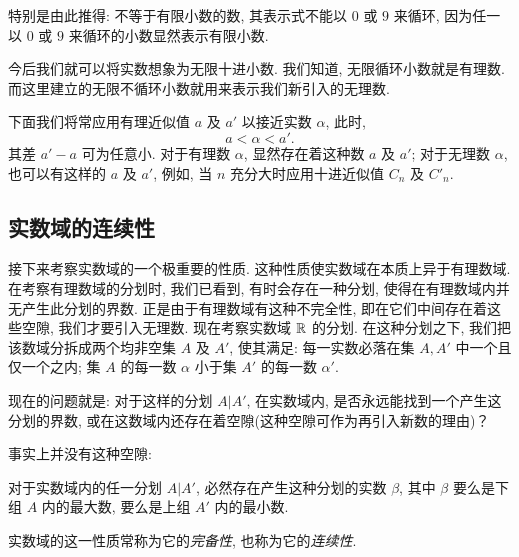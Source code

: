 特别是由此推得:
不等于有限小数的数, 其表示式不能以 $0$ 或 $9$ 来循环,
因为任一以 $0$ 或 $9$ 来循环的小数显然表示有限小数.

今后我们就可以将实数想象为无限十进小数.
我们知道, 无限循环小数就是有理数.
而{\kaishu 这里建立的无限不循环小数就用来表示我们新引入的无理数}.

\begin{remark}\label{rem:rational_approx}
下面我们将常应用有理近似值 $a$ 及 $a'$ 以接近实数 $\alpha$, 此时,
$$ a < \alpha < a'. $$
其差 $a' - a$ 可为任意小.
对于有理数 $\alpha$, 显然存在着这种数 $a$ 及 $a'$;
对于无理数 $\alpha$, 也可以有这样的 $a$ 及 $a'$,
例如, 当 $n$ 充分大时应用十进近似值 $C_n$ 及 $C'_n$.
\end{remark}

\subsection{实数域的连续性}\label{subsec:10}

接下来考察实数域的一个极重要的性质.
这种性质使实数域在本质上异于有理数域.
在考察有理数域的分划时, 我们已看到, 有时会存在一种分划, 使得在有理数域内并无产生此分划的界数.
正是由于有理数域有这种不完全性, 即在它们中间存在着这些空隙, 我们才要引入无理数.
现在考察实数域 $\mathbb{R}$ 的分划.
在这种分划之下, 我们把该数域分拆成两个均非空集 $A$ 及 $A'$, 使其满足:
{\kaishu
    \label{ax:real_cut_1} 每一实数必落在集 $A, A'$ 中一个且仅一个之内;
    \label{ax:real_cut_2} 集 $A$ 的每一数 $\alpha$ 小于集 $A'$ 的每一数 $\alpha'$.
}

现在的问题就是:
对于这样的分划 $A|A'$, 在实数域内, 是否永远能找到一个产生这分划的界数,
或在这数域内还存在着空隙(这种空隙可作为再引入新数的理由)？

事实上并没有这种空隙:

\begin{namedtheorem}\label{thm:dedekind_cut}
对于实数域内的任一分划 $A|A'$, 必然存在产生这种分划的实数 $\beta$,
其中 $\beta$ 要么是下组 $A$ 内的最大数, 要么是上组 $A'$ 内的最小数.
\end{namedtheorem}

实数域的这一性质常称为它的\emph{完备性},
也称为它的\emph{连续性}.

